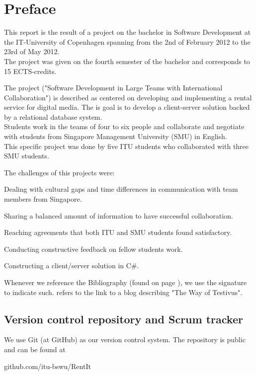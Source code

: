 \chapter{Preface}
\label{Preface}
This report is the result of a project on the bachelor in Software Development at the IT-University of Copenhagen spanning from the 2nd of February 2012 to the 23rd of May 2012. \\The project was given on the fourth semester of the bachelor and corresponds to 15 ECTS-credits.

The project ("Software Development in Large Teams with International Collaboration") is described as centered on developing and implementing a rental service for digital media. The is goal is to develop a client-server solution backed by a relational database system. \\Students work in the teams of four to six people and collaborate and negotiate with students from Singapore Management University (SMU) in English.\\This specific project was done by five ITU students who collaborated with three SMU students.

The challenges of this projects were:
\begin{my_itemize}
\item Dealing with cultural gaps and time differences in communication with team members from Singapore.
\item Sharing a balanced amount of information to have successful collaboration.
\item Reaching agreements that both ITU and SMU students found satisfactory.
\item Conducting constructive feedback on fellow students work.
\item Constructing a client/server solution in C\#.
\end{my_itemize}
Whenever we reference the Bibliography (found on page \pageref{Biblio}), we use the signature \cite{WoT} to indicate such. \cite{WoT} refers to the link to a blog describing "The Way of Testivus".

\section{Version control repository and Scrum tracker}
\label{Preface_Trackers}
We use Git (at GitHub) as our version control system. The repository is public and can be found at \begin{my_itemize}\item github.com/itu-bswu/RentIt\end{my_itemize}

